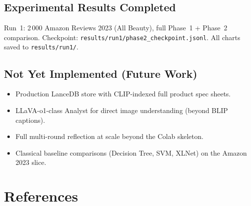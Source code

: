\documentclass[12pt,a4paper]{article}
\begin{document}
\subsection{Experimental Results Completed}

Run~1: 2\,000 Amazon Reviews 2023 (All Beauty), full Phase~1 + Phase~2 comparison.
Checkpoint: \texttt{results/run1/phase2\_checkpoint.jsonl}. All charts saved to
\texttt{results/run1/}.

\subsection{Not Yet Implemented (Future Work)}

\begin{itemize}[leftmargin=*]
  \item Production LanceDB store with CLIP-indexed full product spec sheets.
  \item LLaVA-o1-class Analyst for direct image understanding (beyond BLIP captions).
  \item Full multi-round reflection at scale beyond the Colab skeleton.
  \item Classical baseline comparisons (Decision Tree, SVM, XLNet) on the Amazon 2023 slice.
\end{itemize}

\section{References}
\end{document}
